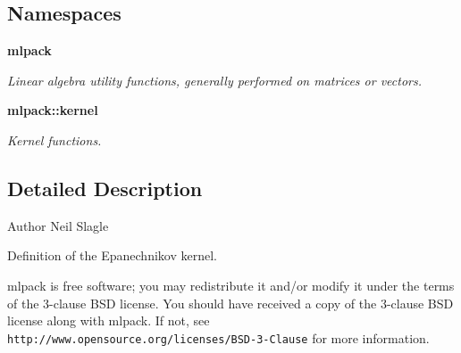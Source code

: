 \subsection*{Namespaces}
\begin{DoxyCompactItemize}
\item 
 \textbf{ mlpack}
\begin{DoxyCompactList}\small\item\em Linear algebra utility functions, generally performed on matrices or vectors. \end{DoxyCompactList}\item 
 \textbf{ mlpack\+::kernel}
\begin{DoxyCompactList}\small\item\em Kernel functions. \end{DoxyCompactList}\end{DoxyCompactItemize}


\subsection{Detailed Description}
\begin{DoxyAuthor}{Author}
Neil Slagle
\end{DoxyAuthor}
Definition of the Epanechnikov kernel.

mlpack is free software; you may redistribute it and/or modify it under the terms of the 3-\/clause B\+SD license. You should have received a copy of the 3-\/clause B\+SD license along with mlpack. If not, see {\tt http\+://www.\+opensource.\+org/licenses/\+B\+S\+D-\/3-\/\+Clause} for more information. 